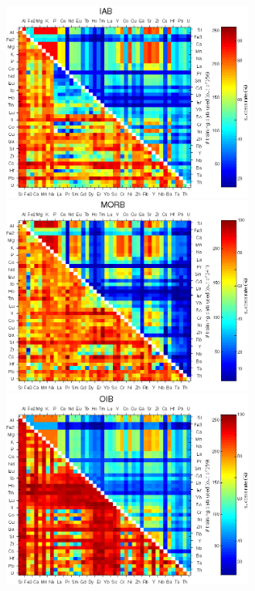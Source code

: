 \begin{figure}[htbp]
  \centering
  \includegraphics[width=300]{figures/xPlotTrace3Ti_linear_IAB.jpg}
  \includegraphics[width=300]{figures/xPlotTrace3Ti_linear_MORB.jpg}\\
  \includegraphics[width=300]{figures/xPlotTrace3Ti_linear_OIB.jpg}

\end{figure}
